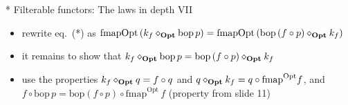 \documentclass[english]{beamer}
\begin{document}
\begin{frame}{{*} Filterable functors: The laws in depth VII}
\begin{itemize}
\begin{itemize}
{\footnotesize{}$k_{f}^{A\Rightarrow1+B}=f\circ\text{id}_{\diamond_{\text{\textbf{Opt}}}}$;}
then we have $\text{fmapOpt}\left(k_{f}\right)=\text{fmap}\,k_{f}\circ\text{flatten}=\text{fmap}\:f\circ\text{fmap}\,\text{id}_{\diamond_{\text{\textbf{Opt}}}}\circ\text{flatten}=\text{fmap}\,f$
\item rewrite eq.\ ({*}) as {\footnotesize{}$\text{fmapOpt}\left(k_{f}\diamond_{\text{\textbf{Opt}}}\text{bop}\,p\right)=\text{fmapOpt}\left(\text{bop}\left(f\circ p\right)\diamond_{\text{\textbf{Opt}}}k_{f}\right)$ }{\footnotesize \par}
\item it remains to show that {\footnotesize{}$k_{f}\diamond_{\text{\textbf{Opt}}}\text{bop}\,p=\text{bop}\left(f\circ p\right)\diamond_{\text{\textbf{Opt}}}k_{f}$ }{\footnotesize \par}
\item use the properties {\footnotesize{}$k_{f}\diamond_{\text{\textbf{Opt}}}q=f\circ q$
and $q\diamond_{\text{\textbf{Opt}}}k_{f}=q\circ\text{fmap}^{\text{Opt}}f$,
and $f\circ\text{bop}\,p=\text{bop}\left(f\circ p\right)\circ\text{fmap}^{\text{Opt}}\,f$
(property from slide 11)}{\footnotesize \par}
\end{itemize}
\end{itemize}
\end{frame}
\end{document}
